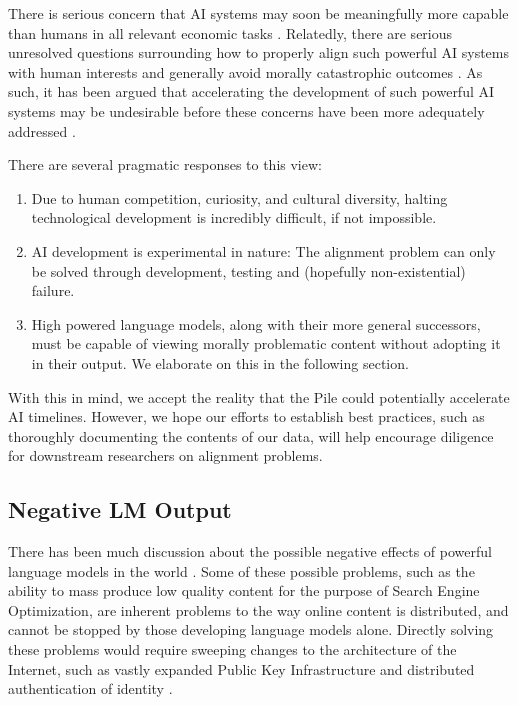\documentclass[11pt,a4paper]{article}
\begin{document}
There is serious concern that AI systems may soon be meaningfully more capable than humans in all relevant economic tasks \citep{grace_when_2018,IEM}. Relatedly, there are serious unresolved questions surrounding how to properly align such powerful AI systems with human interests \citep{bostrom2014ethics,russell2019human,bostrom2014superintelligence,amodei_concrete_2016} and generally avoid morally catastrophic outcomes \citep{sotala_superintelligence_2017,monster}. As such, it has been argued that accelerating the development of such powerful AI systems may be undesirable before these concerns have been more adequately addressed \citep{bostrom2014superintelligence}. 

There are several pragmatic responses to this view: 
\begin{enumerate}
\item Due to human competition, curiosity, and cultural diversity, halting technological development is incredibly difficult, if not impossible. \citep{russell2019human} \citep{critch2020ai}
\item AI development is experimental in nature: The alignment problem can only be solved through development, testing and (hopefully non-existential) failure.
\item High powered language models, along with their more general successors, must be capable of viewing morally problematic content without adopting it in their output. We elaborate on this in the following section.
\end{enumerate}

With this in mind, we accept the reality that the Pile could potentially accelerate AI timelines. However, we hope our efforts to establish best practices, such as thoroughly documenting the contents of our data, will help encourage diligence for downstream researchers on alignment problems.

\subsection{Negative LM Output}

There has been much discussion about the possible negative effects of powerful language models in the world \citep{GPT3,brundage_malicious_2018}. Some of these possible problems, such as the ability to mass produce low quality content for the purpose of Search Engine Optimization, are inherent problems to the way online content is distributed, and cannot be stopped by those developing language models alone. Directly solving these problems would require sweeping changes to the architecture of the Internet, such as vastly expanded Public Key Infrastructure and distributed authentication of identity \citep{practical_cryptography}. 
\end{document}
